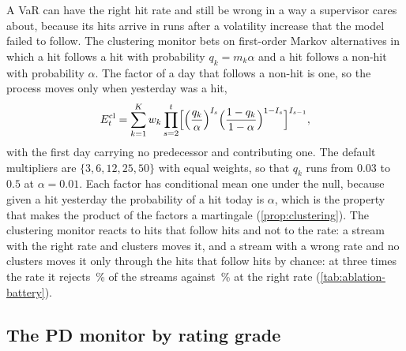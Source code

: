 A VaR can have the right hit rate and still be wrong in a way a supervisor cares about, because its hits arrive in runs after a volatility increase that the model failed to follow. The clustering
monitor bets on first-order Markov alternatives in which a hit follows a hit with probability $q_k=m_k\alpha$ and a hit follows a non-hit with probability $\alpha$. The factor of a day that follows a non-hit is one,
so the process moves only when yesterday was a hit,
\begin{equation}
E_t^{\mathrm{cl}}=\sum_{k=1}^{K}w_k\prod_{s=2}^{t}\Bigl[\Bigl(\frac{q_k}{\alpha}\Bigr)^{I_s}\Bigl(\frac{1-q_k}{1-\alpha}\Bigr)^{1-I_s}\Bigr]^{I_{s-1}},
\label{eq:cluster}
\end{equation}
with the first day carrying no predecessor and contributing one. The default multipliers are $\{3,6,12,25,50\}$ with equal weights, so that $q_k$ runs from $0.03$ to $0.5$ at $\alpha=0.01$. Each factor has conditional mean one under the null,
because given a hit yesterday the probability of a hit today is $\alpha$, which is the property that makes the product of the factors a martingale (\cref{prop:clustering}). The clustering monitor reacts to hits that follow hits and not to the rate: a stream with the right rate and
clusters moves it, and a stream with a wrong rate and no clusters moves it only through the hits that follow hits by chance: at three times the rate it rejects \nAbBatThreeCluster\,\% of the streams against \nAbBatNullCluster\,\% at the right rate (\cref{tab:ablation-battery}).

\subsection{The PD monitor by rating grade}
\label{sec:method-pd}

